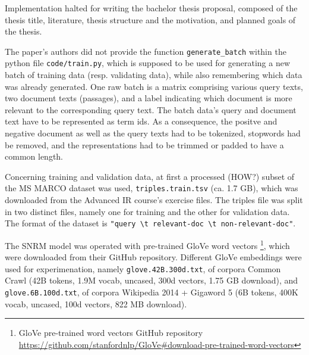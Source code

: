 



Implementation halted for writing the bachelor thesis proposal, composed of the thesis title, literature, thesis structure and the motivation, 
    and planned goals of the thesis.

The paper's authors did not provide the function \verb|generate_batch| within the python file \verb|code/train.py|, 
    which is supposed to be used for generating a new batch of training data (resp. validating data), while also remembering which 
    data was already generated.
One raw batch is a matrix comprising various query texts, two document texts (passages), and a label indicating which document 
    is more relevant to the corresponding query text.
The batch data's query and document text have to be represented as term ids. 
As a consequence, the positve and negative document as well as the query texts had to be tokenized, stopwords had be removed,
    and the representations had to be trimmed or padded to have a common length.

Concerning training and validation data, at first a processed (HOW?) subset of the MS MARCO dataset was used, 
    \verb|triples.train.tsv| (ca. 1.7 GB), which was downloaded from the Advanced IR course's exercise files.
The triples file was split in two distinct files, namely one for training and the other for validation data.
The format of the dataset is \verb|"query \t relevant-doc \t non-relevant-doc"|.

The SNRM model was operated with pre-trained GloVe word vectors
    \footnote{GloVe pre-trained word vectors GitHub repository \url{https://github.com/stanfordnlp/GloVe\#download-pre-trained-word-vectors}},
    which were downloaded from their GitHub repository.
Different GloVe embeddings were used for experimenation, namely \verb|glove.42B.300d.txt|, 
    of corpora Common Crawl (42B tokens, 1.9M vocab, uncased, 300d vectors, 1.75 GB download), 
    and \verb|glove.6B.100d.txt|, of corpora Wikipedia 2014 + Gigaword 5 (6B tokens, 400K vocab, uncased, 100d vectors, 822 MB download).

